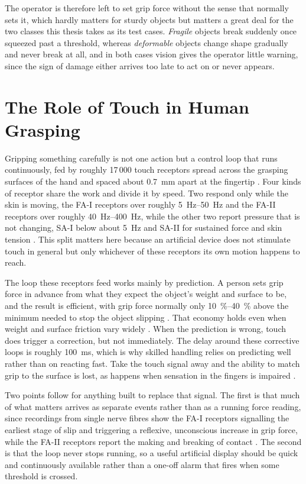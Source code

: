 \documentclass[12pt, a4paper, twoside, openright]{report}
\begin{document}
The operator is therefore left to set grip force without the sense that
normally sets it, which hardly matters for sturdy objects but matters a great
deal for the two classes this thesis takes as its test cases. \emph{Fragile}
objects break suddenly once squeezed past a threshold, whereas
\emph{deformable} objects change shape gradually and never break at all, and in
both cases vision gives the operator little warning, since the sign of damage
either arrives too late to act on or never appears.

\section{The Role of Touch in Human Grasping}
\label{sec:role-of-touch}

Gripping something carefully is not one action but a control loop that runs
continuously, fed by roughly 17\,000 touch receptors spread across the grasping
surfaces of the hand and spaced about \SI{0.7}{\milli\metre} apart at the
fingertip \cite{howe1992}. Four kinds of receptor share the work and divide it
by speed. Two respond only while the skin is moving, the FA-I receptors over
roughly \SIrange{5}{50}{\hertz} and the FA-II receptors over roughly
\SIrange{40}{400}{\hertz}, while the other two report pressure that is not
changing, SA-I below about \SI{5}{\hertz} and SA-II for sustained force and
skin tension \cite{johansson2009}. This split matters here because an
artificial device does not stimulate touch in general but only whichever of
these receptors its own motion happens to reach.

The loop these receptors feed works mainly by prediction. A person sets grip
force in advance from what they expect the object's weight and surface to be,
and the result is efficient, with grip force normally only
\SIrange{10}{40}{\percent} above the minimum needed to stop the object
slipping \cite{johansson2009}. That economy holds even when weight and surface
friction vary widely \cite{howe1992}. When the prediction is wrong, touch does
trigger a correction, but not immediately. The delay around these corrective
loops is roughly \SI{100}{\milli\second}, which is why skilled handling relies
on predicting well rather than on reacting fast. Take the touch signal away
and the ability to match grip to the surface is lost, as happens when
sensation in the fingers is impaired \cite{johansson2009}.

Two points follow for anything built to replace that signal. The first is that
much of what matters arrives as separate events rather than as a running force
reading, since recordings from single nerve fibres show the FA-I receptors
signalling the earliest stage of slip and triggering a reflexive, unconscious
increase in grip force, while the FA-II receptors report the making and
breaking of contact \cite{howe1992}. The second is that the loop never stops
running, so a useful artificial display should be quick and continuously
available rather than a one-off alarm that fires when some threshold is
crossed.
\end{document}
